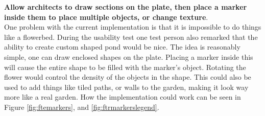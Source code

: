 \textbf{Allow architects to draw sections on the plate, then place a marker inside them to place multiple objects, or change texture}.\\ One problem with the current implementation is that it is impossible to do things like a flowerbed. During the usability test one test person also remarked that the ability to create custom shaped pond would be nice. The idea is reasonably simple, one can draw enclosed shapes on the plate. Placing a marker inside this will cause the entire shape to be filled with the marker's object. Rotating the flower would control the density of the objects in the shape. This could also be used to add things like tiled paths, or walls to the garden, making it look way more like a real garden. How the implementation could work can be seen in Figure \ref{fig:ftemarkers}, and \ref{fig:ftrmarkerslegend}.
